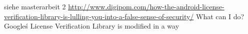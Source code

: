 siehe masterarbeit 2
\url{http://www.digipom.com/how-the-android-license-verification-library-is-lulling-you-into-a-false-sense-of-security/} What can I do?
\newline
 Google\'s License Verification Library is modified in a way
